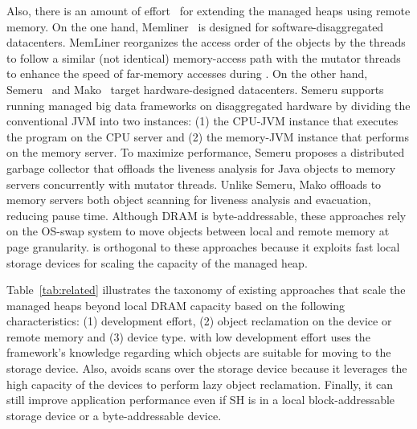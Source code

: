 Also, there is an amount of effort~\cite{wang:memliner, wang:semeru,
ma:mako} for extending the managed heaps using remote memory. On the
one hand, Memliner~\cite{wang:memliner} is designed for
software-disaggregated datacenters. MemLiner reorganizes the access
order of the objects by the \teraheapGC threads to follow a similar (not
identical) memory-access path with the mutator threads to enhance the
speed of far-memory accesses during \teraheapGC. On the other hand,
Semeru~\cite{wang:semeru} and Mako~\cite{ma:mako} target
hardware-designed datacenters. Semeru supports running managed big
data frameworks on disaggregated hardware by dividing the conventional
JVM into two instances:
%
(1) the CPU-JVM instance that executes the program on the CPU server
and
%
(2) the memory-JVM instance that performs \teraheapGC on the memory
server.
%
To maximize \teraheapGC performance, Semeru proposes a distributed garbage
collector that offloads the liveness analysis for Java objects to
memory servers concurrently with mutator threads. Unlike Semeru, Mako
offloads to memory servers both object scanning for liveness analysis
and evacuation, reducing \teraheapGC pause time. Although DRAM is
byte-addressable, these approaches rely on the OS-swap system to move
objects between local and remote memory at page granularity. \teraheapName{}
is orthogonal to these approaches because it exploits fast local storage devices for scaling the
capacity of the managed heap.



Table~\ref{tab:related} illustrates the taxonomy of existing
approaches that scale the managed heaps beyond local DRAM capacity
based on the following characteristics:
%
(1) development effort,
%
(2) object reclamation on the device or remote memory and
%
(3) device type.
%
\teraheapName{} with low development effort uses the framework's knowledge
regarding which objects are suitable for moving to the storage device.
Also, \teraheapName{} avoids \teraheapGC scans over the storage device because it leverages the
high capacity of the devices to perform lazy object reclamation.
Finally, it can still improve application performance even if SH is in
a local block-addressable storage device or a byte-addressable device.

